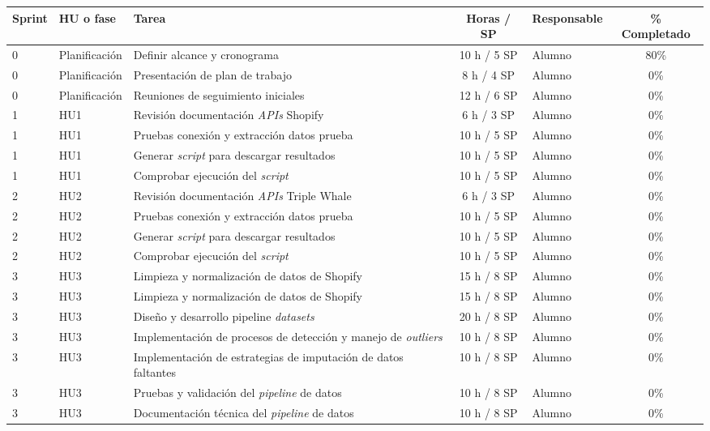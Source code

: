 \documentclass[
11pt, %
]{charter}
\begin{document}
\begin{table}[htpb]
\centering
\begin{tabularx}{\linewidth}{@{}|l|l|X|c|l|c|@{}}
\hline
\rowcolor[HTML]{C0C0C0}
Sprint & HU o fase & Tarea & Horas / SP & Responsable & \% Completado \\ \hline
0 & Planificación & Definir alcance y cronograma & 10 h / 5 SP & Alumno & 80\% \\ \hline
0 & Planificación & Presentación de plan de trabajo & 8 h / 4 SP & Alumno & 0\% \\ \hline
0 & Planificación & Reuniones de seguimiento iniciales & 12 h / 6 SP & Alumno & 0\% \\ \hline

1 & HU1 & Revisión documentación \textit{APIs} Shopify & 6 h / 3 SP & Alumno & 0\% \\ \hline
1 & HU1 & Pruebas conexión y extracción datos prueba & 10 h / 5 SP & Alumno & 0\% \\ \hline
1 & HU1 & Generar \textit{script} para descargar resultados & 10 h / 5 SP & Alumno & 0\% \\ \hline
1 & HU1 & Comprobar ejecución del \textit{script} & 10 h / 5 SP & Alumno & 0\% \\ \hline

2 & HU2 & Revisión documentación \textit{APIs} Triple Whale & 6 h / 3 SP & Alumno & 0\% \\ \hline
2 & HU2 & Pruebas conexión y extracción datos prueba & 10 h / 5 SP & Alumno & 0\% \\ \hline
2 & HU2 & Generar \textit{script} para descargar resultados & 10 h / 5 SP & Alumno & 0\% \\ \hline
2 & HU2 & Comprobar ejecución del \textit{script} & 10 h / 5 SP & Alumno & 0\% \\ \hline

3 & HU3 & Limpieza y normalización de datos de Shopify & 15 h / 8 SP & Alumno & 0\% \\ \hline
3 & HU3 & Limpieza y normalización de datos de Shopify & 15 h / 8 SP & Alumno & 0\% \\ \hline
3 & HU3 & Diseño y desarrollo pipeline \textit{datasets} & 20 h / 8 SP & Alumno & 0\% \\ \hline
3 & HU3 & Implementación de procesos de detección y manejo de \textit{outliers} & 10 h / 8 SP & Alumno & 0\% \\ \hline
3 & HU3 & Implementación de estrategias de imputación de datos faltantes & 10 h / 8 SP & Alumno & 0\% \\ \hline
3 & HU3 & Pruebas y validación del \textit{pipeline} de datos & 10 h / 8 SP & Alumno & 0\% \\ \hline
3 & HU3 & Documentación técnica del \textit{pipeline} de datos & 10 h / 8 SP & Alumno & 0\% \\ \hline




\end{tabularx}
\end{table}
\end{document}
